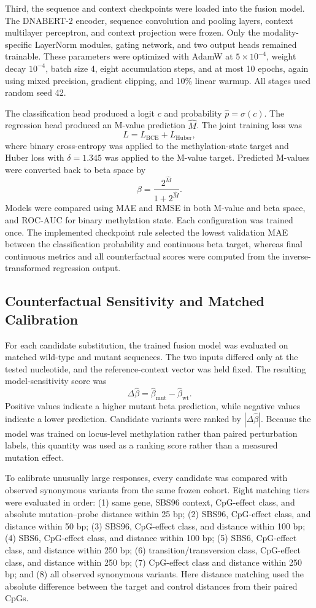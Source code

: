 \documentclass[10pt,letterpaper,twocolumn]{article}
\begin{document}
Third, the sequence and context checkpoints were loaded into the fusion
model. The DNABERT-2 encoder, sequence convolution and pooling layers,
context multilayer perceptron, and context projection were frozen. Only
the modality-specific LayerNorm modules, gating network, and two output
heads remained trainable. These parameters were optimized with AdamW at
$5\times10^{-4}$, weight decay $10^{-4}$, batch size 4, eight
accumulation steps, and at most 10 epochs, again using mixed precision,
gradient clipping, and 10\% linear warmup. All stages used random seed
42.

The classification head produced a logit $c$ and probability
$\hat p=\sigma(c)$. The regression head produced an M-value prediction
$\hat M$. The joint training loss was
\[
L=L_{\mathrm{BCE}}+L_{\mathrm{Huber}},
\]
where binary cross-entropy was applied to the methylation-state target
and Huber loss with $\delta=1.345$ was applied to the M-value target.
Predicted M-values were converted back to beta space by
\[
\hat\beta=\frac{2^{\hat M}}{1+2^{\hat M}}.
\]
Models were compared using MAE and RMSE in both M-value and beta space,
and ROC-AUC for binary methylation state. Each configuration was trained
once. The implemented checkpoint rule selected the lowest validation
MAE between the classification probability and continuous beta target,
whereas final continuous metrics and all counterfactual scores were
computed from the inverse-transformed regression output.

\subsection{Counterfactual Sensitivity and Matched Calibration}
\label{sec:counterfactual-inference}

For each candidate substitution, the trained fusion model was evaluated
on matched wild-type and mutant sequences. The two inputs differed only
at the tested nucleotide, and the reference-context vector was held
fixed. The resulting model-sensitivity score was
\[
\Delta\hat\beta=
\hat\beta_{\mathrm{mut}}-\hat\beta_{\mathrm{wt}}.
\]
Positive values indicate a higher mutant beta prediction, while negative
values indicate a lower prediction. Candidate variants were ranked by
$|\Delta\hat\beta|$. Because the model was trained on locus-level
methylation rather than paired perturbation labels, this quantity was
used as a ranking score rather than a measured mutation effect.

To calibrate unusually large responses, every candidate was compared
with observed synonymous variants from the same frozen cohort. Eight
matching tiers were evaluated in order: (1) same gene, SBS96 context,
CpG-effect class, and absolute mutation--probe distance within 25 bp;
(2) SBS96, CpG-effect class, and distance within 50 bp; (3) SBS96,
CpG-effect class, and distance within 100 bp; (4) SBS6, CpG-effect
class, and distance within 100 bp; (5) SBS6, CpG-effect class, and
distance within 250 bp; (6) transition/transversion class, CpG-effect
class, and distance within 250 bp; (7) CpG-effect class and distance
within 250 bp; and (8) all observed synonymous variants. Here distance
matching used the absolute difference between the target and control
distances from their paired CpGs.
\end{document}
